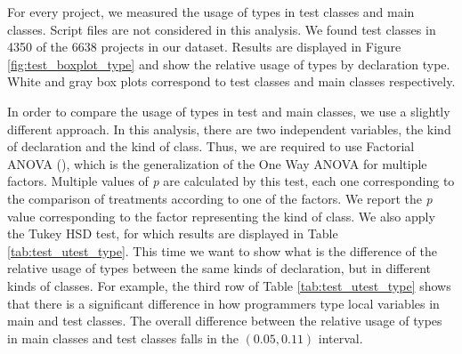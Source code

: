 \documentclass[msc]{ppgccufmg}
\begin{document}
For every project, we measured the usage of types in test classes and main classes.
Script files are not considered in this analysis.
We found test classes in 4350 of the 6638 projects in our dataset.
Results are displayed in Figure \ref{fig:test_boxplot_type} and show the relative usage of types by declaration type.
White and gray box plots correspond to test classes and main classes respectively.

In order to compare the usage of types in test and main classes, we use a slightly different approach.
In this analysis, there are two independent variables, the kind of declaration and the kind of class.
Thus, we are required to use Factorial ANOVA (\cite{Wohlin2012}), which is the generalization of the One Way ANOVA for multiple factors.
Multiple values of \emph{p} are calculated by this test, each one corresponding to the comparison of treatments according to one of the factors.
We report the \emph{p} value corresponding to the factor representing the kind of class.
We also apply the Tukey HSD test, for which results are displayed in Table \ref{tab:test_utest_type}.
This time we want to show what is the difference of the relative usage of types between the same kinds of declaration, but in different kinds of classes.
For example, the third row of Table \ref{tab:test_utest_type} shows that there is a significant difference in how programmers type local variables in main and test classes.
The overall difference between the relative usage of types in main classes and test classes falls in the $(0.05, 0.11)$ interval.
\end{document}
